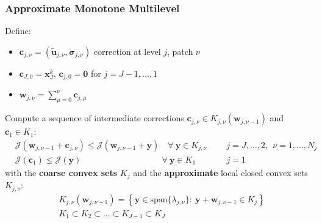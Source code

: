 \documentclass[8pt, oneside]{beamer}   	%
\newcommand{\bc}{\textbf{c}}
\newcommand{\bw}{\textbf{w}}
\newcommand{\bu}{\textbf{u}}
\newcommand{\by}{\textbf{y}}
\newcommand{\bbx}{\textbf{x}}
\newcommand{\bsigma}{\boldsymbol{\sigma}}
\begin{document}
\begin{frame}
\frametitle{\textbf{Approximate Monotone Multilevel}}
Define:
\begin{itemize}
\item $\bc_{j,\nu}=(\tilde{\bu}_{j,\nu},\tilde{\bsigma}_{j,\nu})$ correction at level $j$, patch $\nu$
\item $ \bc_{J,0}= \bbx_J^k $, $ \bc_{j,0}= \textbf{0} $ for $j=J-1,...,1$
\item $ \bw_{j,\nu}= \sum_{\mu=0}^{\nu}  \bc_{j,\mu}$ 
\end{itemize}
Compute a sequence of intermediate corrections $\bc_{j,\nu} \in K_{j,\nu}(\bw_{j,\nu-1})$  and $  \bc_{1}  \in K_1 $:
\begin{align*}
& { \mathcal{J}( \bw_{j,\nu-1}+\bc_{j,\nu}) \leq \mathcal{J}( \bw_{j,\nu-1}+\by) \quad \forall \: \by \in K_{j,\nu}} && j=J,...,2, \: \: \nu=1,...,N_j\\
&
{
  \mathcal{J}( \bc_{1}) \leq \mathcal{J}( \by) \quad   \:   \qquad \qquad \qquad \qquad \:
  \forall \: \by  \in K_1} \qquad  &&j=1
\end{align*}
with the \textbf{coarse convex sets} $K_j$ and the \textbf{approximate} local closed convex sets $K_{j,\nu}$:
\begin{align*}
&{ K_{j,\nu}(\bw_{j,\nu-1})=\left\lbrace
\by \in \text{span}\{\lambda_{j,\nu}\}: \: \by +\bw_{j,\nu-1} \in K_j
  \right\rbrace}\\
 &{   K_1 \subset K_2 \subset ... \subset K_{J-1}\subset K_J}
  \end{align*}
\end{frame}

\end{document}
